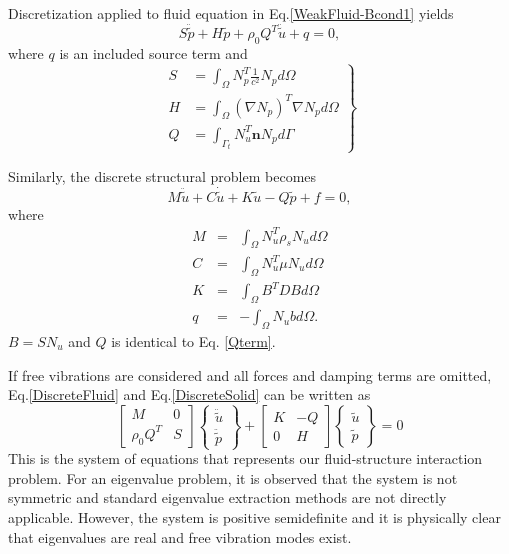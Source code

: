 Discretization applied to fluid equation in Eq.\ref{WeakFluid-Bcond1} yields
\begin{equation}
S\ddot{\tilde{p}}+ H\tilde{p}+\rho_0 Q^T \ddot{\tilde{u}}+q = 0,
\label{DiscreteFluid}
\end{equation}
where $q$ is an included source term and
\begin{equation}
\left.
\begin{aligned}
S & = \int_\Omega N^T_p \frac{1}{c^2} N_p d\Omega \\ %
H & = \int_\Omega (\nabla N_p)^T \nabla N_p d\Omega\\
Q & = \int_{\Gamma_t} N^T_u \mathbf{n} N_p d\Gamma
\end{aligned}
\right\}
\label{Qterm}
\end{equation}

Similarly, the discrete structural problem becomes
\begin{equation}
M\ddot{\tilde{u}}+C\dot{\tilde{u}}+K\tilde{u}-Q\tilde{p}+f=0,
\label{DiscreteSolid}
\end{equation}
where
\begin{eqnarray*}
M & = & \int_\Omega N^T_u \rho_s N_u d\Omega\\
C & = & \int_\Omega N^T_u \mu N_u d\Omega\\
K & = & \int_\Omega B^T D B d\Omega\\
q & = & -\int_\Omega N_u b d\Omega.
\end{eqnarray*}
$B= SN_u$ and $Q$ is identical to Eq. \ref{Qterm}.

If free vibrations are considered and all forces and damping terms are omitted, Eq.\ref{DiscreteFluid} and Eq.\ref{DiscreteSolid} can be written as
\[
\begin{bmatrix}
M & 0\\
\rho_0 Q^T & S
\end{bmatrix}
\begin{Bmatrix}
\ddot{\tilde{u}}\\ \ddot{\tilde{p}}
\end{Bmatrix}
+\begin{bmatrix}
K & -Q\\
0 & H
\end{bmatrix}
\begin{Bmatrix}
\tilde{u}\\ \tilde{p}
\end{Bmatrix} = 0
\]
This is the system of equations that represents our fluid-structure interaction problem. For an eigenvalue problem, it is observed that the system is not symmetric and standard eigenvalue extraction methods are not directly applicable. However, the system is positive semidefinite and it is physically clear that eigenvalues are real and free vibration modes exist.
 
